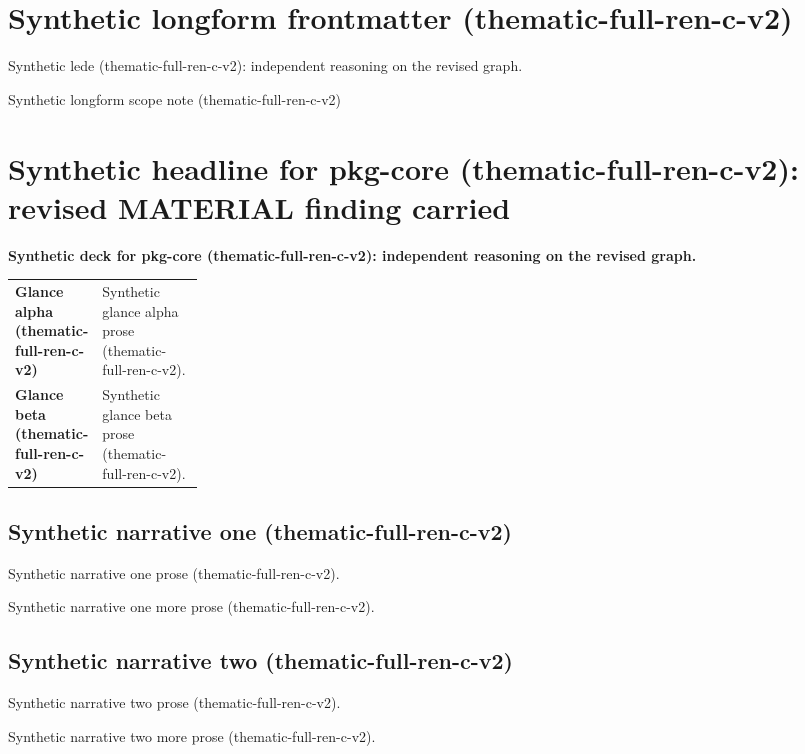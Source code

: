 \documentclass[lualatex,a4paper,10pt]{jlreq}
\begin{document}
\surveycover
\clearpage
\section*{Synthetic longform frontmatter (thematic-full-ren-c-v2)}
Synthetic lede (thematic-full-ren-c-v2): independent reasoning on the revised graph.

\begin{claimboundary}
\noindent Synthetic longform scope note (thematic-full-ren-c-v2)\par
\end{claimboundary}
\medskip
\tableofcontents
\clearpage
\Needspace{0.24\textheight}
\section{Synthetic headline for pkg-core (thematic-full-ren-c-v2): revised MATERIAL finding carried}
\label{pkg:pkg-core}
\noindent\textbf{Synthetic deck for pkg-core (thematic-full-ren-c-v2): independent reasoning on the revised graph.} \cite{sp001lnd001}\par\medskip
\begin{themeoverview}
\begin{tabularx}{\linewidth}{@{}>{\bfseries}p{0.22\linewidth}X@{}}
Glance alpha (thematic-full-ren-c-v2) & Synthetic glance alpha prose (thematic-full-ren-c-v2). \cite{sp001lnd001} \\
Glance beta (thematic-full-ren-c-v2) & Synthetic glance beta prose (thematic-full-ren-c-v2). \cite{sp001lnd001} \\
\end{tabularx}
\end{themeoverview}
\medskip
\begin{multicols}{2}
\subsection*{Synthetic narrative one (thematic-full-ren-c-v2)}
\noindent Synthetic narrative one prose (thematic-full-ren-c-v2). \cite{sp001lnd001}\par\medskip
\noindent Synthetic narrative one more prose (thematic-full-ren-c-v2). \cite{sp001lnd001}\par\medskip
\subsection*{Synthetic narrative two (thematic-full-ren-c-v2)}
\noindent Synthetic narrative two prose (thematic-full-ren-c-v2). \cite{sp001lnd001}\par\medskip
\noindent Synthetic narrative two more prose (thematic-full-ren-c-v2). \cite{sp001lnd001}\par\medskip
\end{multicols}
\end{document}

